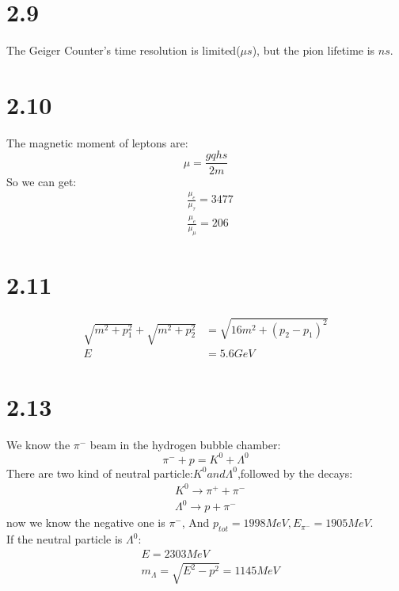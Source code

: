 \documentclass{article}
\begin{document}
\begin{CJK*}{GBK}{song}
\section{2.9}
The Geiger Counter's time resolution is limited($\mu s$), but the pion lifetime is $ns$.

\section{2.10}
The magnetic moment of leptons are:
\begin{equation}
\mu=\frac{gqhs}{2m}
\end{equation}
So we can get:
\begin{equation}
\begin{aligned}
&\frac{\mu_e}{\mu_{\tau}}=3477\\
&\frac{\mu_e}{\mu_{\mu}}=206
\end{aligned}
\end{equation}



\section{2.11}
\begin{equation}
\begin{aligned}
\sqrt{m^2+p_1^2}+\sqrt{m^2+p_2^2}&=\sqrt{16m^2+(p_2-p_1)^2}\\
E&=5.6GeV
\end{aligned}
\end{equation}

\section{2.13}
We know the $\pi^-$ beam in the hydrogen bubble chamber:
\begin{equation}
\pi^-+p=K^0+\Lambda^0
\end{equation}
There are two kind of neutral particle:$K^0 and \Lambda^0$,followed by the decays:
\begin{equation}
\begin{aligned}
&K^0\rightarrow\pi^++\pi^-\\
&\Lambda^0\rightarrow p+\pi^-
\end{aligned}
\end{equation}
now we know the negative one is $\pi^-$, And $p_{tot}=1998MeV,E_{\pi^-}=1905MeV$.\\
If the neutral particle is $\Lambda^0$:
\begin{equation}
\begin{aligned}
&E=2303MeV\\
&m_{\Lambda}=\sqrt{E^2-p^2}=1145MeV
\end{aligned}
\end{equation}


\end{CJK*}
\end{document}
